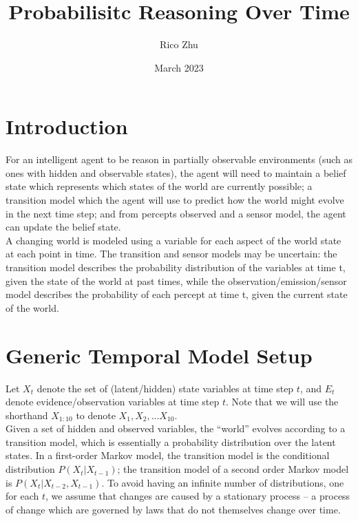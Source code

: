 \documentclass{article}
\title{Probabilisitc Reasoning Over Time}
\author{Rico Zhu}
\date{March 2023}
\begin{document}
\maketitle

\section*{Introduction}

For an intelligent agent to be reason in partially observable environments (such as ones with
hidden and observable states), the agent will need to maintain a belief state which represents
which states of the world are currently possible; a transition model which the agent will
use to predict how the world might evolve in the next time step; and from percepts observed 
and a sensor model, the agent can update the belief state.\\

\noindent A changing world is modeled using a variable for each aspect of the world state at each point in
time. The transition and sensor models may be uncertain: the transition model describes the
probability distribution of the variables at time t, given the state of the world at past times,
while the observation/emission/sensor model describes the probability of each percept at time t, given the current
state of the world.

\section*{Generic Temporal Model Setup}

Let $X_t$ denote the set of (latent/hidden) state variables at time step $t$, and $E_t$ denote
evidence/observation variables at time step $t$. Note that we will use the shorthand $X_{1:10}$
to denote $X_1, X_2, ... X_{10}$.\\

\noindent Given a set of hidden and observed variables, the ``world'' evolves according to a transition
model, which is essentially a probability distribution over the latent states. In a first-order Markov
model, the transition model is the conditional distribution $P(X_{t} | X_{t-1})$; the transition model of
a second order Markov model is $P(X_{t} | X_{t-2}, X_{t-1})$. To avoid having an infinite number of
distributions, one for each $t$, we assume that changes are caused by a stationary process -- a process
of change which are governed by laws that do not themselves change over time.\\
\end{document}
